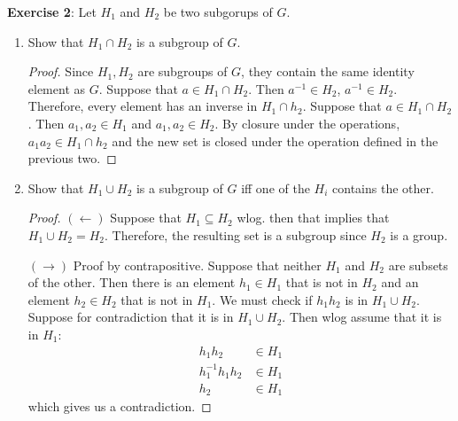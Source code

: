 \documentclass{article}
\begin{document}
\textbf{Exercise 2}: Let $H_{1}$ and $H_{2}$ be two subgorups of $G$.
\begin{enumerate}
	\item Show that $H_{1} \cap H_{2}$ is a subgroup of $G$.

	\begin{proof}
		Since $H_{1}, H_{2}$ are subgroups of $G$, they contain the same identity element as $G$. Suppose that $a \in H_{1} \cap H_{2}$. Then $a^{-1} \in H_{2}$, $a^{-1} \in H_{2}$. Therefore, every element has an inverse in $H_{1} \cap h_{2}$. Suppose that $a \in H_{1} \cap H_{2}$. Then $a_{1}, a_{2} \in H_{1}$ and $a_{1}, a_{2} \in H_{2}$. By closure under the operations, $a_{1}a_{2} \in H_{1} \cap h_{2}$ and the new set is closed under the operation defined in the previous two.
	\end{proof}

	\item Show that $H_{1} \cup H_{2}$ is a subgroup of $G$ iff one of the $H_{i}$ contains the other.
	
	\begin{proof}
		$(\leftarrow)$ Suppose that $H_{1} \subseteq H_{2}$ wlog. then that implies that $H_{1} \cup H_{2} = H_{2}$. Therefore, the resulting set is a subgroup since $H_{2}$ is a group.

		$(\rightarrow)$ Proof by contrapositive. Suppose that neither $H_{1}$ and $H_{2}$ are subsets of the other. Then there is an element $h_{1} \in H_{1}$ that is not in $H_{2}$ and an element $h_{2} \in H_{2}$ that is not in $H_{1}$. We must check if $h_{1}h_{2}$ is in $H_{1} \cup H_{2}$. Suppose for contradiction that it is in $H_{1} \cup H_{2}$. Then wlog assume that it is in $H_{1}$:
		\begin{align*}
			h_{1}h_{2} &\in H_{1} \\
			h_{1}^{-1}h_{1}h_{2} &\in H_{1} \\
			h_{2} &\in H_{1}
		\end{align*}
		which gives us a contradiction.
	\end{proof}
\end{enumerate}
\end{document}
